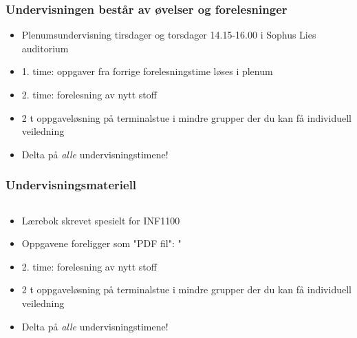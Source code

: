 \documentclass{beamer}
\begin{document}
\begin{frame}
\frametitle{Undervisningen består av øvelser og forelesninger}

\begin{block}{}
\begin{itemize}
\pause
  \item Plenumsundervisning tirsdager og torsdager 14.15-16.00 i Sophus Lies auditorium

\pause
  \item 1. time: oppgaver fra forrige forelesningstime løses i plenum

\pause
  \item 2. time: forelesning av nytt stoff

\pause
  \item 2 t oppgaveløsning på terminalstue i mindre grupper der du kan få individuell veiledning

\pause
  \item Delta på \emph{alle} undervisningstimene!
\end{itemize}

\noindent
\end{block}
\end{frame}

\begin{frame}
\frametitle{Undervisningsmateriell}

\begin{columns}
\begin{block}{}
\begin{itemize}
  \item Lærebok skrevet spesielt for INF1100

  \item Oppgavene foreligger som "PDF fil": "

  \item 2. time: forelesning av nytt stoff

  \item 2 t oppgaveløsning på terminalstue i mindre grupper der du kan få individuell veiledning

  \item Delta på \emph{alle} undervisningstimene!
\end{itemize}

\noindent
\end{block}


\end{columns}
\end{frame}
\end{document}
